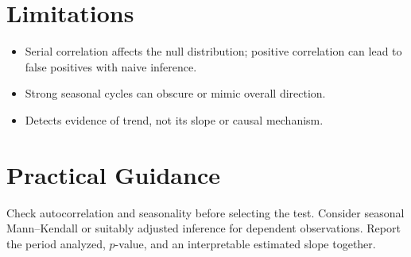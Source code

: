 \documentclass[a4paper]{article}
\begin{document}
\section{Limitations}
\begin{itemize}
 \item Serial correlation affects the null distribution; positive correlation can lead to false positives with naive inference.
 \item Strong seasonal cycles can obscure or mimic overall direction.
 \item Detects evidence of trend, not its slope or causal mechanism.
\end{itemize}
\section{Practical Guidance}
Check autocorrelation and seasonality before selecting the test. Consider seasonal Mann--Kendall or suitably adjusted inference for dependent observations. Report the period analyzed, $p$-value, and an interpretable estimated slope together.



\end{document}
